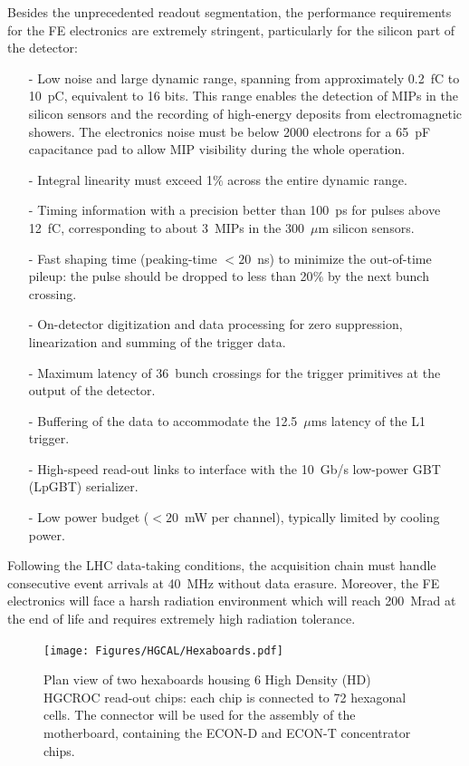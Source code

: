 Besides the unprecedented readout segmentation, the performance requirements for the FE electronics are extremely stringent, particularly for the silicon part of the detector:
\begin{itemize}
    \item [-] Low noise and large dynamic range, spanning from approximately 0.2~fC to 10~pC, equivalent to 16 bits. This range enables the detection of MIPs in the silicon sensors and the recording of high-energy deposits from electromagnetic showers. 
    The electronics noise must be below 2000 electrons for a 65~pF capacitance pad to allow MIP visibility during the whole operation.
    \item [-] Integral linearity must exceed 1$\%$ across the entire dynamic range.
    \item [-] Timing information with a precision better than 100~ps for pulses above 12~fC, corresponding to about 3~MIPs in the 300~$\mu$m silicon sensors.
    \item [-] Fast shaping time (peaking-time $<20$~ns) to minimize the out-of-time pileup: the pulse should be dropped to less than 20$\%$ by the next bunch crossing.
    \item [-] On-detector digitization and data processing for zero suppression, linearization and summing of the trigger data.
    \item [-] Maximum latency of 36~bunch crossings for the trigger primitives at the output of the detector.
    \item [-] Buffering of the data to accommodate the 12.5~$\mu$ms latency of the L1 trigger.
    \item [-] High-speed read-out links to interface with the 10~Gb/s low-power GBT (LpGBT) serializer.
    \item [-] Low power budget ($<20$~mW per channel), typically limited by cooling power.
\end{itemize}

Following the LHC data-taking conditions, the acquisition chain must handle consecutive event arrivals at 40~MHz without data erasure.
Moreover, the FE electronics will face a harsh radiation environment which will reach 200~Mrad at the end of life and requires extremely high radiation tolerance.

\begin{figure}
    \centering
    \texttt{[image: Figures/HGCAL/Hexaboards.pdf]}
    \caption{Plan view of two hexaboards housing 6 High Density (HD) HGCROC read-out chips: each chip is connected to 72 hexagonal cells. The connector will be used for the assembly of the motherboard, containing the ECON-D and ECON-T concentrator chips.}
    \label{fig:Hexaboards}
\end{figure}


